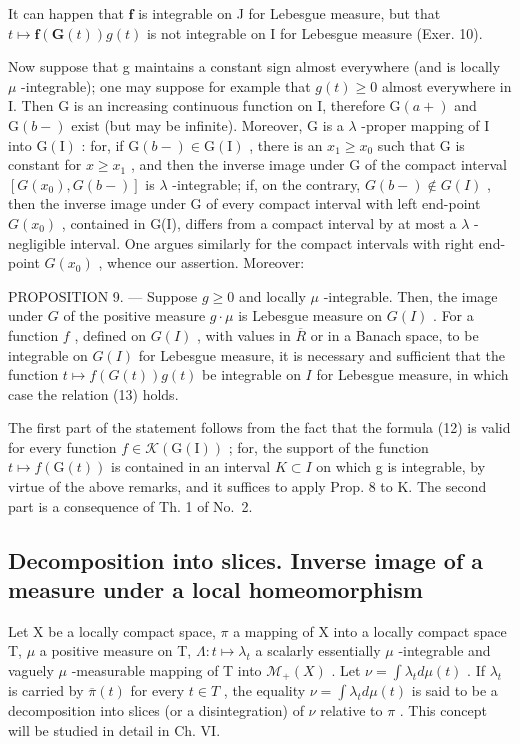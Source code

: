 It can happen that \(\mathbf{f}\) is integrable on J for Lebesgue measure, but that \(t \mapsto \mathbf{f}(\mathbf{G}(t))g(t)\) is not integrable on I for Lebesgue measure (Exer. 10).

Now suppose that g maintains a constant sign almost everywhere (and is locally \(\mu\) -integrable); one may suppose for example that \(g(t) \geqslant 0\) almost everywhere in I. Then G is an increasing continuous function on I, therefore \(\mathrm{G}(a+)\) and \(\mathrm{G}(b-)\) exist (but may be infinite). Moreover, G is a \(\lambda\) -proper mapping of I into \(\mathrm{G}(\mathrm{I})\) : for, if \(\mathrm{G}(b-) \in \mathrm{G}(\mathrm{I})\) , there is an \(x_{1} \geqslant x_{0}\) such that G is constant for \(x \geqslant x_{1}\) , and then the inverse image under G of the compact interval \([G(x_{0}), G(b-)]\) is \(\lambda\) -integrable; if, on the contrary, \(G(b-) \notin G(I)\) , then the inverse image under G of every compact interval with left end-point \(G(x_{0})\) , contained in G(I), differs from a compact interval by at most a \(\lambda\) -negligible interval. One argues similarly for the compact intervals with right end-point \(G(x_{0})\) , whence our assertion. Moreover:

PROPOSITION 9. --- Suppose \(g \geqslant 0\) and locally \(\mu\) -integrable. Then, the image under \(G\) of the positive measure \(g \cdot \mu\) is Lebesgue measure on \(G(I)\) . For a function \(f\) , defined on \(G(I)\) , with values in \(\overline{R}\) or in a Banach space, to be integrable on \(G(I)\) for Lebesgue measure, it is necessary and sufficient that the function \(t \mapsto f(G(t))g(t)\) be integrable on \(I\) for Lebesgue measure, in which case the relation (13) holds.

The first part of the statement follows from the fact that the formula (12) is valid for every function \(f \in \mathcal{K}(\mathrm{G}(\mathrm{I}))\) ; for, the support of the function \(t \mapsto f(\mathrm{G}(t))\) is contained in an interval \(K \subset I\) on which g is integrable, by virtue of the above remarks, and it suffices to apply Prop. 8 to K. The second part is a consequence of Th. 1 of No.~2.

\subsection{Decomposition into slices. Inverse image of a measure under a local homeomorphism}

Let X be a locally compact space, \(\pi\) a mapping of X into a locally compact space T, \(\mu\) a positive measure on T, \(\Lambda: t \mapsto \lambda_t\) a scalarly essentially \(\mu\) -integrable and vaguely \(\mu\) -measurable mapping of T into \(\mathcal{M}_{+}(X)\) . Let \(\nu = \int \lambda_t d\mu(t)\) . If \(\lambda_t\) is carried by \(\overline{\pi}(t)\) for every \(t \in T\) , the equality \(\nu = \int \lambda_t d\mu(t)\) is said to be a decomposition into slices (or a disintegration) of \(\nu\) relative to \(\pi\) . This concept will be studied in detail in Ch. VI.

